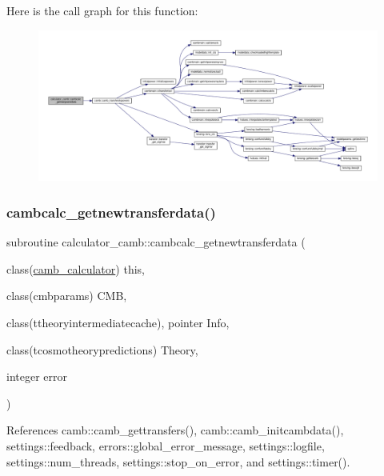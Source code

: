 Here is the call graph for this function\+:
\nopagebreak
\begin{figure}[H]
\begin{center}
\leavevmode
\includegraphics[width=350pt]{namespacecalculator__camb_ad7195d220a7f5bc77479225b47d91d17_cgraph}
\end{center}
\end{figure}
\mbox{\label{namespacecalculator__camb_a9e8887a3ae9da2bb092aac4285234df4}} 
\subsubsection{\texorpdfstring{cambcalc\+\_\+getnewtransferdata()}{cambcalc\_getnewtransferdata()}}
{\footnotesize\ttfamily subroutine calculator\+\_\+camb\+::cambcalc\+\_\+getnewtransferdata (\begin{DoxyParamCaption}\item[{class(\mbox{\hyperlink{structcalculator__camb_1_1camb__calculator}{camb\+\_\+calculator}})}]{this,  }\item[{class(cmbparams)}]{C\+MB,  }\item[{class(ttheoryintermediatecache), pointer}]{Info,  }\item[{class(tcosmotheorypredictions)}]{Theory,  }\item[{integer}]{error }\end{DoxyParamCaption})}



References camb\+::camb\+\_\+gettransfers(), camb\+::camb\+\_\+initcambdata(), settings\+::feedback, errors\+::global\+\_\+error\+\_\+message, settings\+::logfile, settings\+::num\+\_\+threads, settings\+::stop\+\_\+on\+\_\+error, and settings\+::timer().

